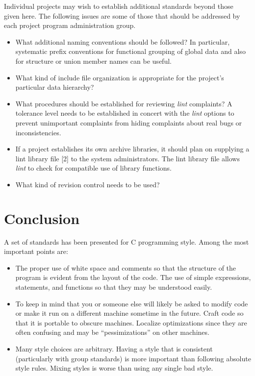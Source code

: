  Individual projects may wish to establish additional standards beyond those
given here. The following issues are some of those that should be addressed by
each project program administration group. 
\begin{itemize}
\item What additional naming conventions should be followed? In particular,
systematic prefix conventions for functional grouping of global data and also
for structure or union member names can be useful. 

\item What kind of include file organization is appropriate for the project's
particular data hierarchy? 

\item What procedures should be established for reviewing {\em lint} complaints?
A tolerance level needs to be established in concert with the {\em lint} options
to prevent unimportant complaints from hiding complaints about real bugs or
inconsistencies.

\item If a project establishes its own archive libraries, it should plan on
supplying a lint library file [2] to the system administrators. The lint
library file allows {\em lint} to check for compatible use of library
functions. 

\item What kind of revision control needs to be used? 
\end{itemize}

\section{Conclusion}

 A set of standards has been presented for C programming style. Among the most
important points are: 
\begin{itemize}
\item The proper use of white space and comments so that the structure of the
program is evident from the layout of the code. The use of simple
expressions, statements, and functions so that they may be understood
easily. 

\item To keep in mind that you or someone else will likely be asked to modify
code or make it run on a different machine sometime in the future. Craft code
so that it is portable to obscure machines. Localize optimizations since they
are often confusing and may be ``pessimizations'' on other machines. 

\item Many style choices are arbitrary. Having a style that is consistent
(particularly with group standards) is more important than following absolute
style rules. Mixing styles is worse than using any single bad style. 

\end{itemize}

